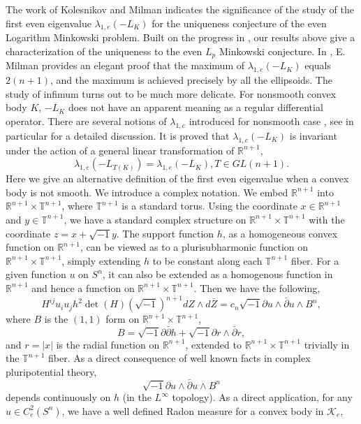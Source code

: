 \documentclass[reqno]{amsart}
\theoremstyle{remark}
\def\R{\mathbb{R}}
\def\cK{{\mathcal K}}
\theoremstyle{plain}
\begin{document}
The work of Kolesnikov and Milman \cite{KM01} indicates the significance of the study of the first even eigenvalue $\lambda_{1, e}(-L_K)$ for the uniqueness conjecture of the  even Logarithm Minkowski problem. 
Built on the progress in \cite{KM01, CHLL, Put}, our results above give a characterization of the uniqueness to the even $L_p$ Minkowski conjecture.
In \cite{Milman22}, E. Milman provides an elegant proof  that the maximum of $\lambda_{1, e}(-L_K)$ equals $2(n+1)$, and the maximum is achieved precisely by all the ellipsoids. The study of infimum turns out to be much more delicate. For nonsmooth convex body $K$,  $-L_K$ does not have an apparent meaning as a regular differential operator. There are several notions of $\lambda_{1, e}$ introduced for nonsmooth case \cite{KM01, Put, Milman22}, see in particular \cite[Section 1.4]{Milman22} for a detailed discussion.  It is proved \cite{KM01} that $\lambda_{1, e}(-L_K)$ is invariant under the action of a general linear transformation of $\R^{n+1}$,  \[\lambda_{1, e}(-L_{T(K)})=\lambda_{1, e}(-L_K), T\in GL(n+1).\]
Here we give an alternative definition of the first even eigenvalue when a convex body is not smooth. 
We introduce a complex notation. We embed $\R^{n+1}$ into $\R^{n+1}\times \mathbb{T}^{n+1}$, where $\mathbb{T}^{n+1}$ is a standard torus.
Using the coordinate $x\in \R^{n+1}$ and $y\in \mathbb{T}^{n+1}$, we have a standard complex structure on $\R^{n+1}\times \mathbb{T}^{n+1}$ with the coordinate $z=x+\sqrt{-1}y$. 
The support function $h$, as a homogeneous convex function on $\R^{n+1}$, can be viewed as to a plurisubharmonic function on $\R^{n+1}\times \mathbb{T}^{n+1}$, simply extending $h$ to be constant along each $\mathbb{T}^{n+1}$ fiber. For a given function $u$ on $S^n$, it can also be extended as a homogenous function in $\R^{n+1}$ and hence a function on $\R^{n+1}\times \mathbb{T}^{n+1}$. Then we have the following,
\[
H^{ij}u_iu_jh^2 \det(H) (\sqrt{-1})^{n+1} dZ\wedge d\bar Z=c_n\sqrt{-1}\partial u\wedge \bar\partial u\wedge B^n,
\]
where $B$ is the $(1, 1)$ form on $\R^{n+1}\times \mathbb{T}^{n+1}$,
\[
B=\sqrt{-1}\partial\bar\partial h+\sqrt{-1}\partial r\wedge \bar \partial r,
\]
and $r=|x|$ is the radial function on $\R^{n+1}$, extended to $\R^{n+1}\times \mathbb{T}^{n+1}$ trivially in the $\mathbb{T}^{n+1}$ fiber. 
As a direct consequence of well known facts in complex pluripotential theory, 
\[
\sqrt{-1}\partial u\wedge \bar\partial u\wedge B^n 
\]
depends continuously on $h$ (in the $L^\infty$ topology). 
As a direct application, for any $u\in C^2_e(S^n)$, we have a well defined Radon measure for a convex body in $\cK_e$,
\end{document}
